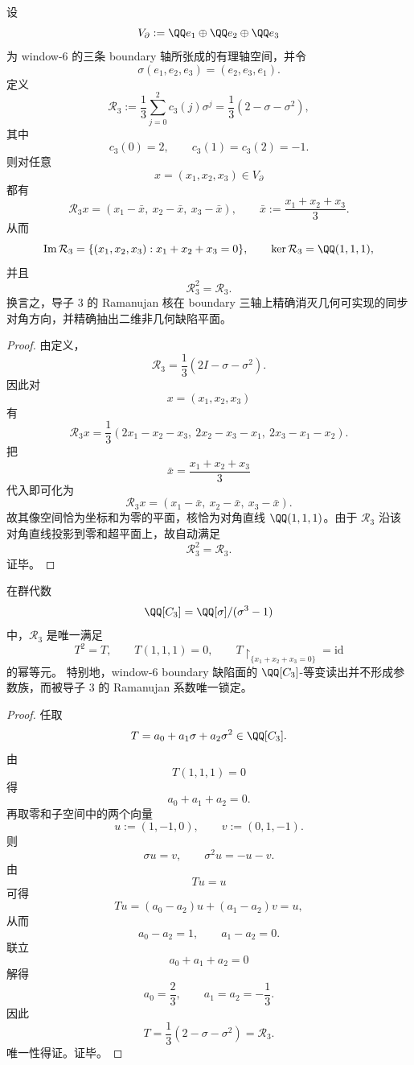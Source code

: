 \begin{theorem}\label{thm:conclusion-window6-boundary-ramanujan-conductor-three-projection}
设
\[
V_{\partial}:=\QQ e_1\oplus \QQ e_2\oplus \QQ e_3
\]
为 window-\(6\) 的三条 boundary 轴所张成的有理轴空间，并令
\[
\sigma(e_1,e_2,e_3)=(e_2,e_3,e_1).
\]
定义
\[
\mathcal R_3:=\frac13\sum_{j=0}^{2}c_3(j)\sigma^j
=\frac13(2-\sigma-\sigma^2),
\]
其中
\[
c_3(0)=2,\qquad c_3(1)=c_3(2)=-1.
\]
则对任意
\[
x=(x_1,x_2,x_3)\in V_{\partial}
\]
都有
\[
\mathcal R_3x=(x_1-\bar x,\ x_2-\bar x,\ x_3-\bar x),
\qquad
\bar x:=\frac{x_1+x_2+x_3}{3}.
\]
从而
\[
\operatorname{Im}\mathcal R_3=\{(x_1,x_2,x_3):x_1+x_2+x_3=0\},
\qquad
\ker \mathcal R_3=\QQ(1,1,1),
\]
并且
\[
\mathcal R_3^2=\mathcal R_3.
\]
换言之，导子 \(3\) 的 Ramanujan 核在 boundary 三轴上精确消灭几何可实现的同步对角方向，并精确抽出二维非几何缺陷平面。
\end{theorem}
\begin{proof}
由定义，
\[
\mathcal R_3=\frac13(2I-\sigma-\sigma^2).
\]
因此对
\[
x=(x_1,x_2,x_3)
\]
有
\[
\mathcal R_3x
=
\frac13(2x_1-x_2-x_3,\ 2x_2-x_3-x_1,\ 2x_3-x_1-x_2).
\]
把
\[
\bar x=\frac{x_1+x_2+x_3}{3}
\]
代入即可化为
\[
\mathcal R_3x=(x_1-\bar x,\ x_2-\bar x,\ x_3-\bar x).
\]
故其像空间恰为坐标和为零的平面，核恰为对角直线 \(\QQ(1,1,1)\)。由于 \(\mathcal R_3\) 沿该对角直线投影到零和超平面上，故自动满足
\[
\mathcal R_3^2=\mathcal R_3.
\]
证毕。
\end{proof}

\begin{proposition}\label{prop:conclusion-window6-boundary-ramanujan-conductor-three-rigid-uniqueness}
在群代数
\[
\QQ[C_3]=\QQ[\sigma]/(\sigma^3-1)
\]
中，\(\mathcal R_3\) 是唯一满足
\[
T^2=T,\qquad T(1,1,1)=0,
\qquad
T\!\restriction_{\{x_1+x_2+x_3=0\}}=\mathrm{id}
\]
的幂等元。
特别地，window-\(6\) boundary 缺陷面的 \(\QQ[C_3]\)-等变读出并不形成参数族，而被导子 \(3\) 的 Ramanujan 系数唯一锁定。
\end{proposition}
\begin{proof}
任取
\[
T=a_0+a_1\sigma+a_2\sigma^2\in \QQ[C_3].
\]
由
\[
T(1,1,1)=0
\]
得
\[
a_0+a_1+a_2=0.
\]
再取零和子空间中的两个向量
\[
u:=(1,-1,0),\qquad v:=(0,1,-1).
\]
则
\[
\sigma u=v,\qquad \sigma^2u=-u-v.
\]
由
\[
Tu=u
\]
可得
\[
Tu=(a_0-a_2)u+(a_1-a_2)v=u,
\]
从而
\[
a_0-a_2=1,\qquad a_1-a_2=0.
\]
联立
\[
a_0+a_1+a_2=0
\]
解得
\[
a_0=\frac23,\qquad a_1=a_2=-\frac13.
\]
因此
\[
T=\frac13(2-\sigma-\sigma^2)=\mathcal R_3.
\]
唯一性得证。证毕。
\end{proof}
